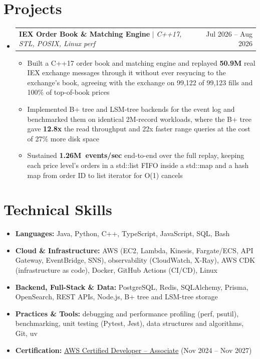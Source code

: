 \documentclass[letterpaper,10pt]{article}
\makeatletter
\newcommand{\resumeItem}[1]{\item{#1}\vspace{-1pt}}
\newcommand{\resumeProjectHeading}[2]{%
  \item
  \begin{tabular*}{\textwidth}{l@{\extracolsep{\fill}}r}
    #1 & #2 \\
  \end{tabular*}\vspace{-6pt}%
}
\newcommand{\resumeSubHeadingListStart}{\begin{itemize}[leftmargin=0in, label={}, itemsep=0pt, topsep=2pt]}
\newcommand{\resumeSubHeadingListEnd}{\end{itemize}}
\newcommand{\resumeItemListStart}{\begin{itemize}[leftmargin=0.18in, itemsep=0pt, topsep=1pt, parsep=0pt]}
\newcommand{\resumeItemListEnd}{\end{itemize}\vspace{0pt}}
\makeatother
\begin{document}
\section{Projects}
\resumeSubHeadingListStart
  \resumeProjectHeading
    {\textbf{IEX Order Book \& Matching Engine} $|$ \textit{C++17, STL, POSIX, Linux perf}}{Jul 2026 -- Aug 2026}
  \resumeItemListStart
    \resumeItem{Built a C++17 order book and matching engine and replayed \textbf{50.9M} real IEX exchange messages through it without ever resyncing to the exchange's book, agreeing with the exchange on 99,122 of 99,123 fills and 100\% of top-of-book prices}
    \resumeItem{Implemented B+ tree and LSM-tree backends for the event log and benchmarked them on identical 2M-record workloads, where the B+ tree gave \textbf{12.8x} the read throughput and 22x faster range queries at the cost of 27\% more disk space}
    \resumeItem{Sustained \mbox{\textbf{1.26M events/sec}} end-to-end over the full replay, keeping each price level's orders in a std::list FIFO inside a std::map and a hash map from order ID to list iterator for O(1) cancels}
  \resumeItemListEnd
\resumeSubHeadingListEnd

\section{Technical Skills}
\begin{itemize}[leftmargin=0in, label={}, itemsep=0pt, topsep=2pt]
  \small
  \item{\textbf{Languages:} Java, Python, C++, TypeScript, JavaScript, SQL, Bash}
  \item{\textbf{Cloud \& Infrastructure:} AWS (EC2, Lambda, Kinesis, Fargate/ECS, API Gateway, EventBridge, SNS), observability (CloudWatch, X-Ray), AWS CDK (infrastructure as code), Docker, GitHub Actions (CI/CD), Linux}
  \item{\textbf{Backend, Full-Stack \& Data:} PostgreSQL, Redis, SQLAlchemy, Prisma, OpenSearch, REST APIs, Node.js, B+ tree and LSM-tree storage}
  \item{\textbf{Practices \& Tools:} debugging and performance profiling (perf, psutil), benchmarking, unit testing (Pytest, Jest), data structures and algorithms, Git, uv}
  \item{\textbf{Certification:} \href{https://www.credly.com/badges/d2406a97-d937-47de-823b-724981159d3b/public_url}{\underline{AWS Certified Developer -- Associate}} (Nov 2024 -- Nov 2027)}
\end{itemize}
\end{document}
